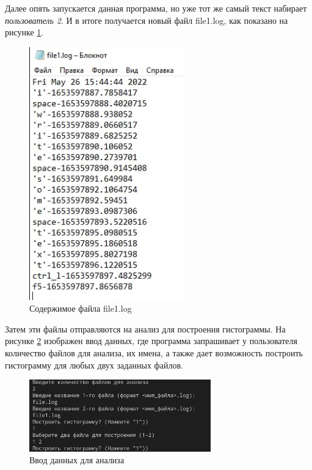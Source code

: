 \documentclass[bachelor, och, coursework]{SCWorks}
\begin{document}
  Далее опять запускается данная программа, но уже тот же самый текст набирает \textit{пользователь 2}. И в итоге получается новый файл file1.log,
  как показано на рисунке \ref{r2}. 



  \begin{figure}[H]
    \centering
    \includegraphics[width=0.6\textwidth]{photo/kl2.png}
    \caption{Содержимое файла file1.log}
    \label{r2}
  \end{figure}

  Затем эти файлы отправляются на анализ для построения гистограммы. На рисунке \ref{analyze} изображен ввод данных, где программа
  запрашивает у пользователя количество файлов для анализа, их имена, а также дает возможность построить гистограмму для любых двух
  заданных файлов.
  
  
  \begin{figure}[H]
    \centering
    \includegraphics[width=0.7\textwidth]{photo/analyze.png}
    \caption{Ввод данных для анализа}
    \label{analyze}
  \end{figure}
  
\end{document}
